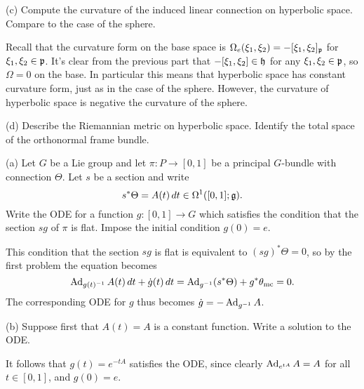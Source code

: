 \documentclass{../../templates/lkx_pset}
\begin{document}
\begin{parts}
  \begin{part}{(c)}
    Compute the curvature of the induced linear connection on hyperbolic space. Compare to the case of the sphere.
  \end{part}

  Recall that the curvature form on the base space is $\Omega_e(\xi_1,\xi_2) = -[\xi_1,\xi_2]_{\mathfrak{p}}$ for $\xi_1,\xi_2\in \mathfrak{p}$. It's clear from the previous part that $-[\xi_1,\xi_2]\in \mathfrak{h}$ for any $\xi_1,\xi_2\in \mathfrak{p}$, so $\Omega=0$ on the base. In particular this means that hyperbolic space has constant curvature form, just as in the case of the sphere. However, the curvature of hyperbolic space is negative the curvature of the sphere.

  \begin{part}{(d)}
    Describe the Riemannian metric on hyperbolic space. Identify the total space of the orthonormal frame bundle.
  \end{part}
\end{parts}
%
%

\begin{problem}{5}
\end{problem}
\begin{parts}
  \begin{part}{(a)}
    Let $G$ be a Lie group and let $\pi : P \to [0,1]$ be a principal $G$-bundle with connection $\Theta$. Let $s$ be a section and write 
    \[
    s^*\Theta = A(t)\,dt\in \Omega^1([0,1]; \mathfrak{g}).
    \]
    Write the ODE for a function $g : [0,1] \to G$ which satisfies the condition that the section $sg$ of $\pi$ is flat. Impose the initial condition $g(0)=e$.
  \end{part}

  This condition that the section $sg$ is flat is equivalent to $(sg)^*\Theta=0$, so by the first problem the equation becomes
  \[
    \operatorname{Ad}_{g(t)^{-1}} A(t)\,dt + \dot{g}(t)\,dt = \operatorname{Ad}_{g^{-1}}(s^*\Theta) + g^*\theta_{\textrm{mc}}=0.
  \]
  The corresponding ODE for $g$ thus becomes $\dot{g} = -\operatorname{Ad}_{g^{-1}} A$.

  \begin{part}{(b)}
    Suppose first that $A(t) = A$ is a constant function. Write a solution to the ODE.
  \end{part}

  It follows that $g(t) = e^{-tA}$ satisfies the ODE, since clearly $\operatorname{Ad}_{e^{tA}} A = A$ for all $t\in [0,1]$, and $g(0)=e$.
\end{parts}
\end{document}
